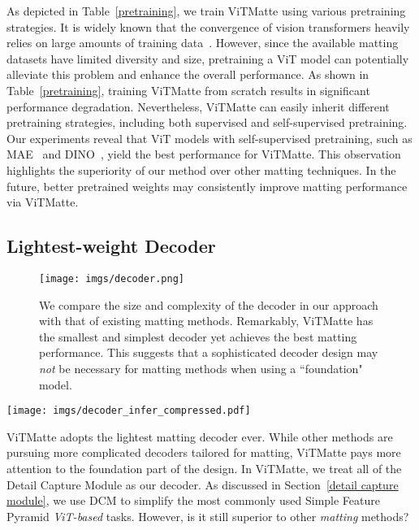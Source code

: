 \documentclass[10pt,twocolumn,letterpaper]{article}
\newcommand{\thename}{ViTMatte}
\begin{document}
As depicted in Table~\ref{pretraining}, we train \thename{} using various pretraining strategies. It is widely known that the convergence of vision transformers heavily relies on large amounts of training data~\cite{vit}. However, since the available matting datasets have limited diversity and size, pretraining a ViT model can potentially alleviate this problem and enhance the overall performance. As shown in Table~\ref{pretraining}, training \thename{} from scratch results in significant performance degradation. Nevertheless, \thename{} can easily inherit different pretraining strategies, including both supervised and self-supervised pretraining. Our experiments reveal that ViT models with self-supervised pretraining, such as MAE~\cite{he2022masked} and DINO~\cite{dino}, yield the best performance for \thename{}. This observation highlights the superiority of our method over other matting techniques. In the future, better pretrained weights may consistently improve matting performance via ViTMatte.

\subsection{Lightest-weight Decoder}

\begin{figure}
    \centering
    \texttt{[image: imgs/decoder.png]}
    \caption{We compare the size and complexity of the decoder in our approach with that of existing matting methods. Remarkably, \thename{} has the smallest and simplest decoder yet achieves the best matting performance. This suggests that a sophisticated decoder design may \emph{not} be necessary for matting methods when using a ``foundation" model.}
    \label{fig:matting_decoders}
\end{figure}

\begin{figure*}[htp]
  \centering
    \texttt{[image: imgs/decoder\_infer\_compressed.pdf]}
  \caption{Visual Results of IndexNet, \thename{} \emph{without DCM} and \thename{}. Please zoom in for the best view.}
  \label{fig:decoder_infer}
\end{figure*}

\thename{} adopts the lightest matting decoder ever. While other methods are pursuing more complicated decoders tailored for matting, \thename{} pays more attention to the foundation part of the design. In \thename{}, we treat all of the Detail Capture Module as our decoder. As discussed in Section~\ref{detail capture module}, we use DCM to simplify the most commonly used Simple Feature Pyramid \emph{ViT-based} tasks. However, is it still superior to other \emph{matting} methods? 
\end{document}
